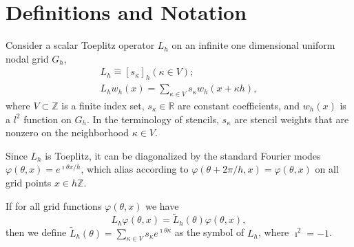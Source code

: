 \documentclass[review]{siamart190516}
\begin{document}
\section{Definitions and Notation}\label{sec:notation}

Consider a scalar Toeplitz operator $L_h$ on an infinite one dimensional uniform nodal grid $G_h$,
\begin{equation}
\begin{split}
L_h \mathrel{\hat{=}} \left[ s_\kappa \right]_h \left( \kappa \in V \right);\\
L_h w_h \left( x \right) = \sum_{\kappa \in V} s_\kappa w_h \left( x + \kappa h \right),
\end{split}
\end{equation}
where $V \subset \mathbb{Z}$ is a finite index set, $s_\kappa \in \mathbb{R}$ are constant coefficients, and $w_h \left( x \right)$ is a $l^2$ function on $G_h$. In the terminology of stencils, $s_{\kappa}$ are stencil weights that are nonzero on the neighborhood $\kappa \in V$.

Since $L_h$ is Toeplitz, it can be diagonalized by the standard Fourier modes $\varphi \left( \theta, x \right) = e^{\imath \theta x / h}$, which alias according to $\varphi(\theta+ 2\pi/h, x) = \varphi(\theta, x)$ on all grid points $x \in h \mathbb Z$.

\begin{definition}[Symbol of $L_h$]\label{def:symbol}
If for all grid functions $\varphi \left( \theta, x \right)$ we have
\begin{equation}
L_h \varphi \left( \theta, x \right) = \tilde{L}_h \left( \theta \right) \varphi \left( \theta, x \right),
\end{equation}
then we define $\tilde{L}_h \left( \theta \right) = \sum_{\kappa \in V} s_\kappa e^{\imath \theta \kappa}$ as the symbol of $L_h$, where $\imath^2 = -1$.
\end{definition}
\end{document}
